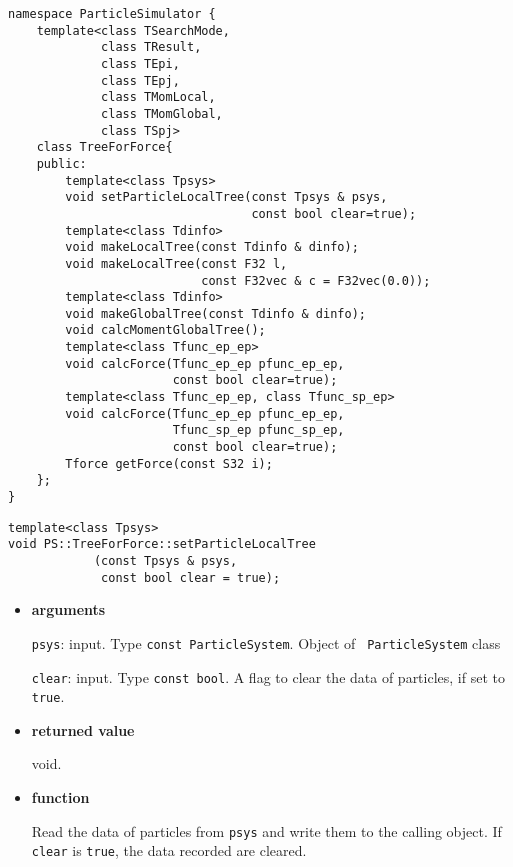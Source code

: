 \begin{lstlisting}[caption=TreeForForce1]
namespace ParticleSimulator {
    template<class TSearchMode,
             class TResult,
             class TEpi,
             class TEpj,
             class TMomLocal,
             class TMomGlobal,
             class TSpj>
    class TreeForForce{
    public:
        template<class Tpsys>
        void setParticleLocalTree(const Tpsys & psys,
                                  const bool clear=true);
        template<class Tdinfo>
        void makeLocalTree(const Tdinfo & dinfo);
        void makeLocalTree(const F32 l,
                           const F32vec & c = F32vec(0.0));
        template<class Tdinfo>
        void makeGlobalTree(const Tdinfo & dinfo);        
        void calcMomentGlobalTree();
        template<class Tfunc_ep_ep>
        void calcForce(Tfunc_ep_ep pfunc_ep_ep,
                       const bool clear=true);  
        template<class Tfunc_ep_ep, class Tfunc_sp_ep>
        void calcForce(Tfunc_ep_ep pfunc_ep_ep,
                       Tfunc_sp_ep pfunc_sp_ep,
                       const bool clear=true);
        Tforce getForce(const S32 i);
    };
}
\end{lstlisting}


\begin{screen}
\begin{verbatim}
template<class Tpsys>
void PS::TreeForForce::setParticleLocalTree
            (const Tpsys & psys,
             const bool clear = true);
\end{verbatim}
\end{screen}

\begin{itemize}

\item {\bf arguments}

{\tt psys}: input. Type {\tt const ParticleSystem}. Object of {\tt
ParticleSystem} class

{\tt clear}: input. Type {\tt const bool}. A flag to clear the data of
particles, if set to {\tt true}.

\item {\bf returned value}

void.

\item {\bf function}

Read the data of particles from {\tt psys} and write them to the
calling object.  If {\tt clear} is {\tt true}, the data recorded are
cleared.

\end{itemize}

